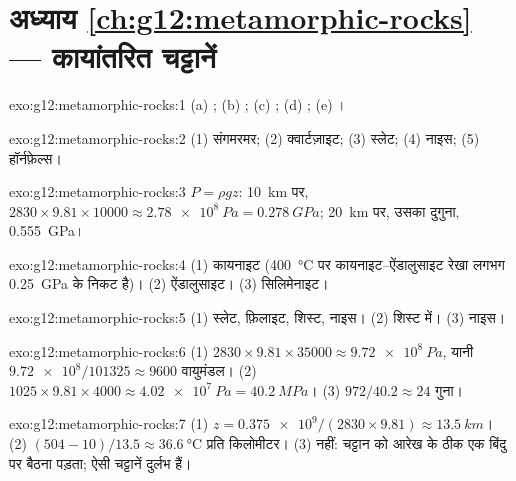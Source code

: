 \section*{अध्याय \ref{ch:g12:metamorphic-rocks} --- कायांतरित चट्टानें}

\begin{solution}{exo:g12:metamorphic-rocks:1}
(a) ; (b) ; (c) ; (d) ;
(e) ।
\end{solution}

\begin{solution}{exo:g12:metamorphic-rocks:2}
(1) संगमरमर; (2) क्वार्टज़ाइट; (3) स्लेट; (4) नाइस; (5) हॉर्नफ़ेल्स।
\end{solution}

\begin{solution}{exo:g12:metamorphic-rocks:3}
$P = \rho g z$: \qty{10}{km} पर, $2830 \times 9.81 \times \num{10000} \approx
\qty{2.78e8}{Pa} = \qty{0.278}{GPa}$; \qty{20}{km} पर, उसका दुगुना,
\qty{0.555}{GPa}।
\end{solution}

\begin{solution}{exo:g12:metamorphic-rocks:4}
(1) कायनाइट (\qty{400}{\celsius} पर कायनाइट--ऐंडालुसाइट रेखा लगभग \qty{0.25}{GPa}
के निकट है)। (2) ऐंडालुसाइट। (3) सिलिमेनाइट।
\end{solution}

\begin{solution}{exo:g12:metamorphic-rocks:5}
(1) स्लेट, फ़िलाइट, शिस्ट, नाइस। (2) शिस्ट में। (3) नाइस।
\end{solution}

\begin{solution}{exo:g12:metamorphic-rocks:6}
(1) $2830 \times 9.81 \times \num{35000} \approx \qty{9.72e8}{Pa}$, यानी
$\num{9.72e8}/101325 \approx \num{9600}$ वायुमंडल। (2) $1025 \times 9.81
\times 4000 \approx \qty{4.02e7}{Pa} = \qty{40.2}{MPa}$। (3) $972/40.2
\approx 24$ गुना।
\end{solution}

\begin{solution}{exo:g12:metamorphic-rocks:7}
(1) $z = \num{0.375e9}/(2830 \times 9.81) \approx \qty{13.5}{km}$।
(2) $(504 - 10)/13.5 \approx \qty{36.6}{\celsius}$ प्रति किलोमीटर। (3) नहीं:
चट्टान को आरेख के ठीक एक बिंदु पर बैठना पड़ता; ऐसी चट्टानें
दुर्लभ हैं।
\end{solution}

